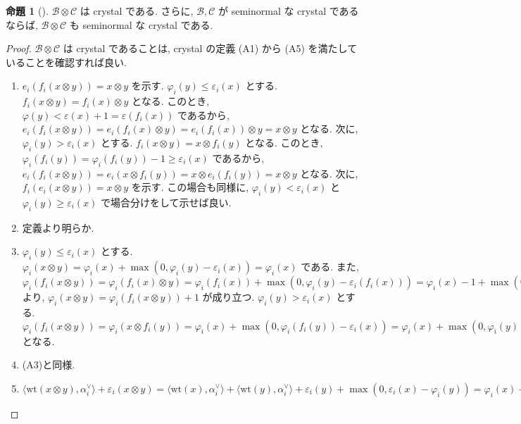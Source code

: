 \documentclass[
  a4paper, 
  12pt,
  ja=standard,
  xelatex,
  left=30truemm,
  right=30truemm,
  titlepage 
]{bxjsarticle}
\theoremstyle{definition}
\newtheorem{prop}[thm]{命題}
\begin{document}
\begin{prop}[{\cite[命題2.29]{b1}}]
  $\mathcal{B} \otimes \mathcal{C}$ は crystal である.
  さらに, $\mathcal{B}, \mathcal{C}$ が seminormal な crystal であるならば, $\mathcal{B} \otimes \mathcal{C}$ も seminormal な crystal である. 
\end{prop}

\begin{proof}
  $\mathcal{B} \otimes \mathcal{C}$ は crystal であることは, crystal の定義 (A1) から (A5) を満たしていることを確認すれば良い.
  \begin{enumerate}
    \item[(A1)] $e_i(f_i(x \otimes y)) = x \otimes y$ を示す.
    $\varphi_i(y) \leq \varepsilon_i(x)$ とする. $f_i(x \otimes y) = f_i(x) \otimes y$ となる.
    このとき,
    $\varphi(y) < \varepsilon(x) + 1 = \varepsilon(f_i(x))$ であるから, $e_i(f_i(x \otimes y)) = e_i(f_i(x) \otimes y) = e_i(f_i(x)) \otimes y
    = x \otimes y$ となる. 次に, $\varphi_i(y) > \varepsilon_i(x)$ とする. $f_i(x \otimes y) = x \otimes f_i(y)$ となる.
    このとき,
    $\varphi_i(f_i(y)) = \varphi_i(f_i(y)) - 1 \geq \varepsilon_i(x)$ であるから, $e_i(f_i(x \otimes y)) = e_i(x \otimes f_i(y)) = x \otimes e_i(f_i(y))
    = x \otimes y$ となる. 次に, $f_i(e_i(x \otimes y)) = x \otimes y$ を示す. この場合も同様に, $\varphi_i(y) < \varepsilon_i(x)$ と $\varphi_i(y) \geq \varepsilon_i(x)$
    で場合分けをして示せば良い. 
    \item[(A2)] 定義より明らか. 
    \item[(A3)] $\varphi_i(y) \leq \varepsilon_i(x)$ とする. 
    $\varphi_i(x \otimes y) = \varphi_i(x) + \max ( 0, \varphi_i(y) - \varepsilon_i(x) ) = \varphi_i(x)$ である.
    また, $\varphi_i(f_i(x \otimes y)) = \varphi_i(f_i(x) \otimes y) = \varphi_i(f_i(x)) + \max ( 0, \varphi_i(y) - \varepsilon_i(f_i(x)) ) =
    \varphi_i(x) - 1 + \max ( 0, \varphi_i(y) - \varepsilon_i(x) - 1) = \varphi_i(x) - 1$ より, $\varphi_i(x \otimes y) = \varphi_i(f_i(x \otimes y)) + 1$
    が成り立つ. $\varphi_i(y) > \varepsilon_i(x)$ とする. $\varphi_i(f_i(x \otimes y)) = \varphi_i(x \otimes f_i(y)) = \varphi_i(x) + \max ( 0, \varphi_i(f_i(y)) - \varepsilon_i(x) )
    = \varphi_i(x) + \max ( 0, \varphi_i(y) - 1 - \varepsilon_i(x) ) = \varphi_i(x) + \varphi_i(y) - \varepsilon_i(x) - 1 =  \varphi_i(x \otimes y) - 1$ となる.
    \item[(A4)] (A3)と同様. 
    \item[(A5)] $\langle \mathrm{wt}(x \otimes y), \alpha_i^{\vee} \rangle + \varepsilon_i(x \otimes y)
    = \langle \mathrm{wt}(x), \alpha_i^{\vee} \rangle + \langle \mathrm{wt}(y), \alpha_i^{\vee} \rangle + \varepsilon_i(y) + \max ( 0, \varepsilon_i(x) -  \varphi_i(y))
    = \varphi_i(x) + \max ( 0, \varphi_i(y) - \varepsilon_i(x) )
    = \varphi_i(x \otimes y)
    $
  \end{enumerate}


\end{proof}
\end{document}
